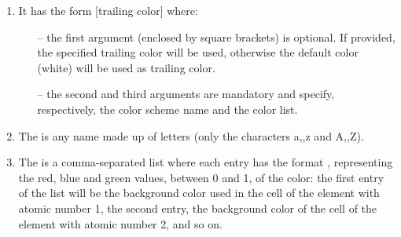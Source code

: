 \begin{enumerate}
    \item It has the form [trailing color]\blue{\{}\blue{\}\{}\blue{\}} where:
          \begin{itemize}
              \item[--] the first argument (enclosed by square brackets) is optional. If provided, the specified trailing color will be used, otherwise the default color (white) will be used as trailing color.%
              \item[--] the second and third arguments are mandatory and specify, respectively, the color scheme name and the color list.
          \end{itemize}
    \item The  is any name made up of letters (only the characters a,\myldots,z and A,\myldots,Z).
    \item The  is a comma-separated list where each entry has the format , representing the red, blue and green values, between 0 and 1, of the color: the first entry of the list will be the background color used in the cell of the element with atomic number 1, the second entry, the background color of the cell of the element with atomic number 2, and so on.
          \\ [8pt]
\end{enumerate}
\ %
\\ [-44pt]\ %
\def\tmpSection{\textcolor{cyan}{pgfPTcolorSchemes.html}}%
